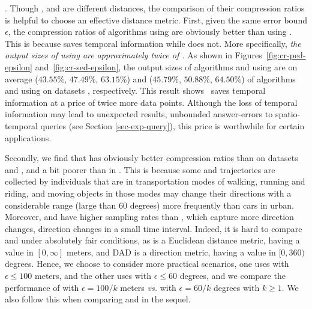 .
Though \ped, \sed and \dad are different distances, the comparison of their compression ratios is helpful to choose an effective distance metric.
%
First,  given the same error bound $\epsilon$, the compression ratios of algorithms using \ped are obviously better
than using \sed.
{This is because \sed saves temporal information while \ped does not}.
More specifically, \emph{the output sizes of using \sed are approximately twice of \ped.}
%
As shown in Figures~\ref{fig:cr-ped-epsilon} and~\ref{fig:cr-sed-epsilon}, the output sizes of algorithms \tpa and \dpa
using \ped are on average ($43.55\%$, $47.49\%$, $63.15\%$) and ($45.79\%$,
$50.88\%$, $64.50\%$) of algorithms \tpa and \dpa using \sed on datasets \dSets, respectively.
%
%
This result shows ~\sed saves temporal information at a price of twice more data points. {Although the loss of temporal information may lead to unexpected results, \eg unbounded answer-errors to spatio-temporal queries (see Section \ref{sec-exp-query}), this price is worthwhile for certain applications. }


Secondly, {we find that \sed has obviously better compression ratios than \dad on datasets \geolife and \mopsi, and a bit poorer than \dad in \ucar.}
This is because some \geolife and \mopsi trajectories are collected by individuals that are in transportation modes of walking, running and riding, and moving objects in those modes may change their directions with a considerable range (\eg large than $60$ degrees) more frequently than cars in urban. Moreover, \geolife and \mopsi have higher sampling rates than \ucar, which capture more direction changes, \ie direction changes in a small time interval.
%
{Indeed, it is hard to compare \sed and \dad under absolutely fair conditions, as \sed is a Euclidean distance metric, having a value in $[0, \infty]$ meters, and DAD is a direction metric,  having a value in $[0,360)$ degrees. Hence, we choose to consider more practical scenarios, \ie one uses \sed with $\epsilon  \le  100$ meters, and the other uses \dad with $\epsilon \le 60$ degrees, and we compare the performance of \sed with $\epsilon=100/k$ meters \emph{vs.} \dad with $\epsilon=60/k$ degrees with $k \ge 1$. We also follow this when comparing \sed and \dad in the sequel.}



